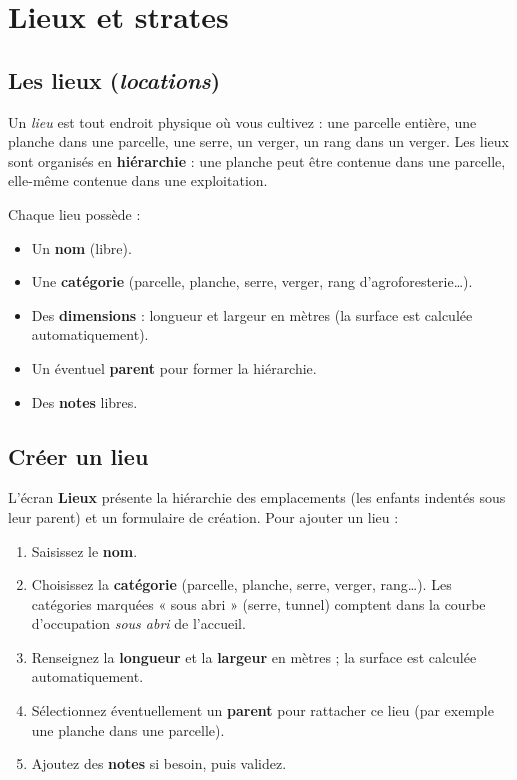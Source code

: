 \chapter{Lieux et strates}
\label{chap:lieux}

\section{Les lieux (\emph{locations})}

Un \emph{lieu} est tout endroit physique où vous cultivez : une parcelle entière, une planche dans une parcelle, une serre, un verger, un rang dans un verger. Les lieux sont organisés en \textbf{hiérarchie} : une planche peut être contenue dans une parcelle, elle-même contenue dans une exploitation.

Chaque lieu possède :

\begin{itemize}
  \item Un \textbf{nom} (libre).
  \item Une \textbf{catégorie} (parcelle, planche, serre, verger, rang d'agroforesterie…).
  \item Des \textbf{dimensions} : longueur et largeur en mètres (la surface est calculée automatiquement).
  \item Un éventuel \textbf{parent} pour former la hiérarchie.
  \item Des \textbf{notes} libres.
\end{itemize}

\section{Créer un lieu}

L'écran \textbf{Lieux} présente la hiérarchie des emplacements (les enfants indentés sous leur parent) et un formulaire de création. Pour ajouter un lieu :

\begin{enumerate}
  \item Saisissez le \textbf{nom}.
  \item Choisissez la \textbf{catégorie} (parcelle, planche, serre, verger, rang…). Les catégories marquées « sous abri » (serre, tunnel) comptent dans la courbe d'occupation \emph{sous abri} de l'accueil.
  \item Renseignez la \textbf{longueur} et la \textbf{largeur} en mètres ; la surface est calculée automatiquement.
  \item Sélectionnez éventuellement un \textbf{parent} pour rattacher ce lieu (par exemple une planche dans une parcelle).
  \item Ajoutez des \textbf{notes} si besoin, puis validez.
\end{enumerate}


